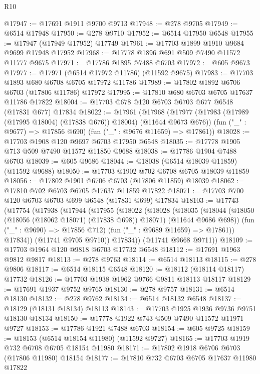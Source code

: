 \begin{lexlean}{R10}
\begin{coremodule}
@17947 := @17691 @1911 @9700 @9713
@17948 := @278 @9705
@17949 := @6514 @17948
@17950 := @278 @9710
@17952 := @6514 @17950 @6548
@17955 := @17947 (@17949 @17952) @17749
@17961 := @17703 @1899 @1910 @9684 @9699 @17948 @17952
@17968 := @17778 @1896 @691 @509 @7490 @11572 @11777 @9675
@17971 := @17786 @1895 @7488 @6703
@17972 := @605 @9673
@17977 := @17971 (@6514 @17972 @11786) (@11592 @9675)
@17983 := @17703 @1893 @680 @6708 @6705 @17972 @11786
@17989 := @17802 @1892 @6706 @6703 (@17806 @11786) @17972
@17995 := @17810 @680 @6703 @6705 @17637 @11786 @17822
@18004 := @17703 @678 @120 @6703 @6703 @677 @6548 (@17831 @677) @17834
@18022 := @17961
    (@17968
      (@17977 (@17983 (@17989 (@17995 @18004) (@17838 @676)) @18004) (@11644 @9673 @676))
      (fun ("_" : @9677) => @17856 @690)
      (fun ("_" : @9676 @11659) => @17861))
@18028 := @17703 @1908 @120 @9697 @6703 @17950 @6548
@18035 := @17778 @1905 @713 @509 @7490 @11572 @11850 @9688
@18038 := @17786 @1904 @7488 @6703
@18039 := @605 @9686
@18044 := @18038 (@6514 @18039 @11859) (@11592 @9688)
@18050 := @17703 @1902 @702 @6708 @6705 @18039 @11859
@18056 := @17802 @1901 @6706 @6703 (@17806 @11859) @18039
@18062 := @17810 @702 @6703 @6705 @17637 @11859 @17822
@18071 := @17703 @700 @120 @6703 @6703 @699 @6548 (@17831 @699) @17834
@18103 := @17743
    (@17754
      (@17938
        (@17944
          (@17955
            (@18022
              (@18028
                (@18035
                  (@18044
                    (@18050 (@18056 (@18062 @18071) (@17838 @698)) @18071)
                    (@11644 @9686 @698))
                  (fun ("_" : @9690) => @17856 @712)
                  (fun ("_" : @9689 @11659) => @17861))
                @17834))
            (@11741 @9705 @9710))
          @17834))
      (@11741 @9668 @9711))
@18109 := @17703 @1964 @120 @9818 @6703 @17732 @6548
@18112 := @17691 @1963 @9812 @9817
@18113 := @278 @9763
@18114 := @6514 @18113
@18115 := @278 @9806
@18117 := @6514 @18115 @6548
@18120 := @18112 (@18114 @18117) @17732
@18126 := @17703 @1938 @1962 @9766 @9811 @18113 @18117
@18129 := @17691 @1937 @9752 @9765
@18130 := @278 @9757
@18131 := @6514 @18130
@18132 := @278 @9762
@18134 := @6514 @18132 @6548
@18137 := @18129 (@18131 @18134) @18113
@18143 := @17703 @1925 @1936 @9736 @9751 @18130 @18134
@18150 := @17778 @1922 @743 @509 @7490 @11572 @11971 @9727
@18153 := @17786 @1921 @7488 @6703
@18154 := @605 @9725
@18159 := @18153 (@6514 @18154 @11980) (@11592 @9727)
@18165 := @17703 @1919 @732 @6708 @6705 @18154 @11980
@18171 := @17802 @1918 @6706 @6703 (@17806 @11980) @18154
@18177 := @17810 @732 @6703 @6705 @17637 @11980 @17822

\end{coremodule}
\end{lexlean}

